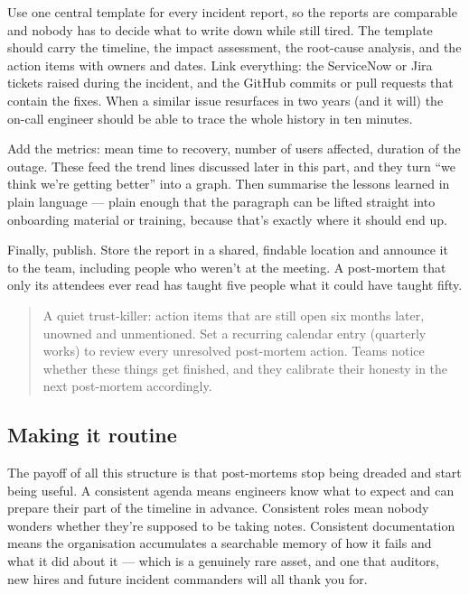 Use one central template for every incident report, so the reports are comparable and nobody has to decide what to write down while still tired. The template should carry the timeline, the impact assessment, the root-cause analysis, and the action items with owners and dates. Link everything: the ServiceNow or Jira tickets raised during the incident, and the GitHub commits or pull requests that contain the fixes. When a similar issue resurfaces in two years (and it will) the on-call engineer should be able to trace the whole history in ten minutes.


Add the metrics: mean time to recovery, number of users affected, duration of the outage. These feed the trend lines discussed later in this part, and they turn ``we think we're getting better'' into a graph. Then summarise the lessons learned in plain language — plain enough that the paragraph can be lifted straight into onboarding material or training, because that's exactly where it should end up.


Finally, publish. Store the report in a shared, findable location and announce it to the team, including people who weren't at the meeting. A post-mortem that only its attendees ever read has taught five people what it could have taught fifty.



\begin{quote}\small
A quiet trust-killer: action items that are still open six months later, unowned and unmentioned. Set a recurring calendar entry (quarterly works) to review every unresolved post-mortem action. Teams notice whether these things get finished, and they calibrate their honesty in the next post-mortem accordingly.
\end{quote}



\subsection{Making it routine}


The payoff of all this structure is that post-mortems stop being dreaded and start being useful. A consistent agenda means engineers know what to expect and can prepare their part of the timeline in advance. Consistent roles mean nobody wonders whether they're supposed to be taking notes. Consistent documentation means the organisation accumulates a searchable memory of how it fails and what it did about it — which is a genuinely rare asset, and one that auditors, new hires and future incident commanders will all thank you for.


